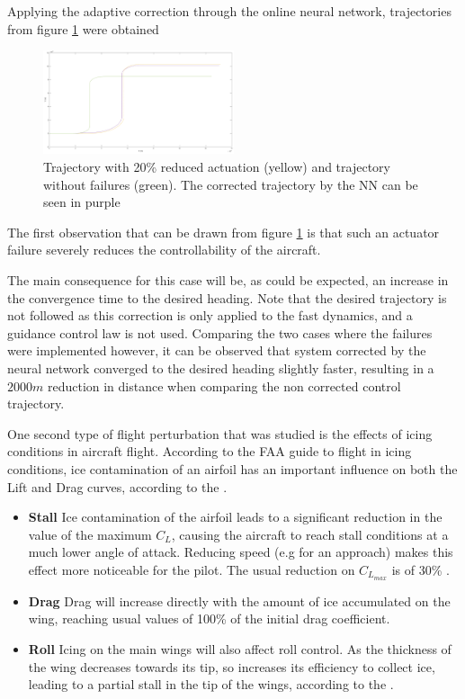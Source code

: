 Applying the adaptive correction through the online neural network, trajectories from figure \ref{fig:reduced_act_NN} were obtained

\begin{figure}[h]
\centering
\includegraphics[width=0.5\textwidth]{../Figures/Results/reduced_act_NN.png}
\caption[Trajectory with reduced actuation corrected with NN correction]{Trajectory with 20\% reduced actuation (yellow) and trajectory without failures (green). The corrected trajectory by the NN can be seen in purple}
\label{fig:reduced_act_NN}
\end{figure}

The first observation that can be drawn from figure \ref{fig:reduced_act_NN} is that such an actuator failure severely reduces the controllability of the aircraft. 

The main consequence for this case will be, as could be expected, an increase in the convergence time to the desired heading. Note that the desired trajectory is not followed as this correction is only applied to the fast dynamics, and a guidance control law is not used. Comparing the two cases where the failures were implemented however, it can be observed that system corrected by the neural network converged to the desired heading slightly faster, resulting in a $2000m$ reduction in distance when comparing the non corrected control trajectory. 

One second type of flight perturbation that was studied is the effects of icing conditions in aircraft flight. According to the FAA guide to flight in icing conditions, ice contamination of an airfoil has an important influence on both the Lift and Drag curves, according to the \cite{icing_cond}.

\begin{itemize}
\item \textbf{Stall }Ice contamination of the airfoil leads to a significant reduction in the value of the maximum $C_L$, causing the aircraft to reach stall conditions at a much lower angle of attack. Reducing speed (e.g for an approach) makes this effect more noticeable for the pilot. The usual reduction on $C_{L_{max}}$ is of 30\% \cite{icing_cond}.

\item \textbf{Drag }Drag will increase directly with the amount of ice accumulated on the wing, reaching usual values of 100\% of the initial drag coefficient.

\item \textbf{Roll }Icing on the main wings will also affect roll control. As the thickness of the wing decreases towards its tip, so increases its efficiency to collect ice, leading to a partial stall in the tip of the wings, according to the \cite{icing_aopa}.
\end{itemize}

